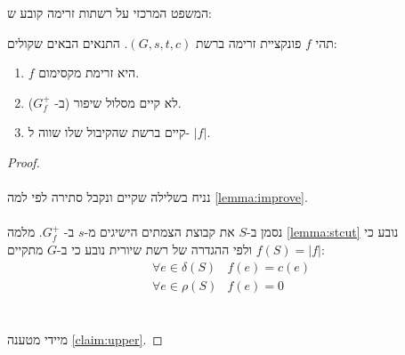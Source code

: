 המשפט המרכזי על רשתות זרימה קובע ש:
\begin{theorem}
\label{theorem:mincutmaxflow}
תהי $f$ פונקציית זרימה ברשת
$(G, s, t, c)$.
התנאים הבאים שקולים:
\begin{enumerate}
\item
$f$
היא זרימת מקסימום.
\item
לא קיים מסלול שיפור (ב-%
$G_f^+$).
\item
קיים 
\stcut{}
ברשת שהקיבול שלו שווה ל-%
$|f|$.
\end{enumerate}
\end{theorem}

\begin{proof}
$ $
\\
\\
נניח בשלילה שקיים ונקבל סתירה לפי למה
\ref{lemma:improve}.
\\
\\
נסמן ב-$S$ את קבוצת הצמתים הישיגים מ-$s$ ב-%
$G_f^+$.
מלמה
\ref{lemma:stcut}
נובע כי
$f(S) = |f|$
ולפי ההגדרה של רשת שיורית נובע כי ב-$G$ מתקיים:
$$
\begin{array}{ll}
\forall e \in \delta(S) & f(e) = c(e)
\\
\forall e \in \rho(S) & f(e) = 0
\end{array}
$$
\\
\\
מיידי מטענה 
\ref{claim:upper}.
\end{proof}

